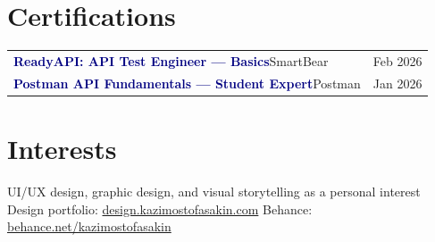 \documentclass[11.5pt, letterpaper]{article}
\begin{document}
\section{Certifications}
\begin{tabularx}{\linewidth}{@{}X r@{}}
  \textcolor{navy}{\bfseries ReadyAPI: API Test Engineer --- Basics}\enspace\textcolor{meta}{\small SmartBear} & \textcolor{meta}{\small Feb 2026} \\[3pt]
  \textcolor{navy}{\bfseries Postman API Fundamentals --- Student Expert}\enspace\textcolor{meta}{\small Postman} & \textcolor{meta}{\small Jan 2026} \\
\end{tabularx}

\section{Interests}
UI/UX design, graphic design, and visual storytelling as a personal interest \enspace\textcolor{meta}{\textbullet}\enspace Design portfolio: \href{https://design.kazimostofasakin.com/}{design.kazimostofasakin.com} \enspace\textcolor{meta}{\textbullet}\enspace Behance: \href{https://behance.net/kazimostofasakin}{behance.net/kazimostofasakin}
\end{document}
